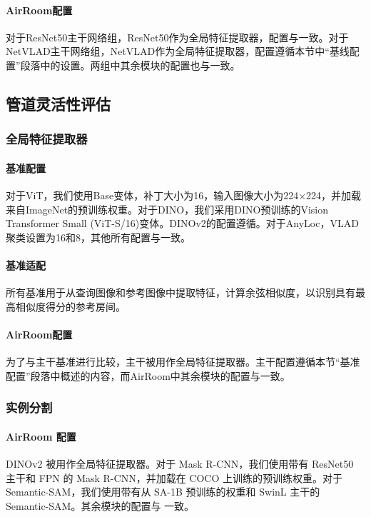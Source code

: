 \paragraph{AirRoom配置} 对于ResNet50主干网络组，ResNet50作为全局特征提取器，配置与一致。对于NetVLAD主干网络组，NetVLAD作为全局特征提取器，配置遵循本节中“基线配置”段落中的设置。两组中其余模块的配置也与一致。
\subsection{管道灵活性评估}

\subsubsection{全局特征提取器}

\paragraph{基准配置} 对于ViT，我们使用Base变体，补丁大小为16，输入图像大小为224×224，并加载来自ImageNet的预训练权重。对于DINO，我们采用DINO预训练的Vision Transformer Small (ViT-S/16)变体。DINOv2的配置遵循。对于AnyLoc，VLAD聚类设置为16和8，其他所有配置与一致。

\paragraph{基准适配} 所有基准用于从查询图像和参考图像中提取特征，计算余弦相似度，以识别具有最高相似度得分的参考房间。

\paragraph{AirRoom配置} 为了与主干基准进行比较，主干被用作全局特征提取器。主干配置遵循本节“基准配置”段落中概述的内容，而AirRoom中其余模块的配置与一致。
\subsubsection{实例分割}

\paragraph{AirRoom 配置} DINOv2 被用作全局特征提取器。对于 Mask R-CNN，我们使用带有 ResNet50 主干和 FPN 的 Mask R-CNN，并加载在 COCO 上训练的预训练权重。对于 Semantic-SAM，我们使用带有从 SA-1B 预训练的权重和 SwinL 主干的 Semantic-SAM。其余模块的配置与  一致。
